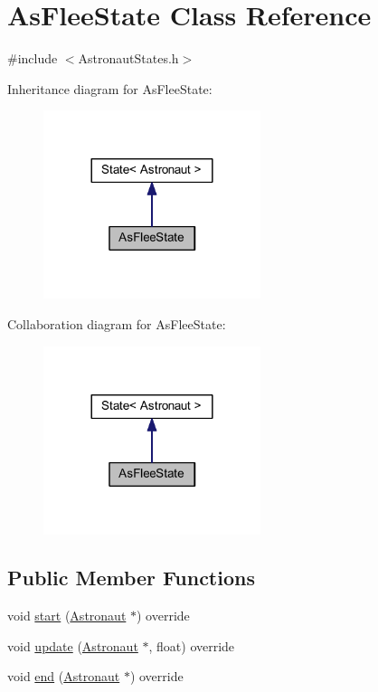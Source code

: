 \hypertarget{class_as_flee_state}{}\section{As\+Flee\+State Class Reference}
\label{class_as_flee_state}


{\ttfamily \#include $<$Astronaut\+States.\+h$>$}



Inheritance diagram for As\+Flee\+State\+:\nopagebreak
\begin{figure}[H]
\begin{center}
\leavevmode
\includegraphics[width=180pt]{class_as_flee_state__inherit__graph}
\end{center}
\end{figure}


Collaboration diagram for As\+Flee\+State\+:\nopagebreak
\begin{figure}[H]
\begin{center}
\leavevmode
\includegraphics[width=180pt]{class_as_flee_state__coll__graph}
\end{center}
\end{figure}
\subsection*{Public Member Functions}
\begin{DoxyCompactItemize}
\item 
void \hyperlink{class_as_flee_state_a73dfdf7af46e5bce0b212030413cd00c}{start} (\hyperlink{class_astronaut}{Astronaut} $\ast$) override
\item 
void \hyperlink{class_as_flee_state_a2a6af75f427daa36c6e480f531e783ee}{update} (\hyperlink{class_astronaut}{Astronaut} $\ast$, float) override
\item 
void \hyperlink{class_as_flee_state_a58912e7f5eed181065942f81d2e4e22a}{end} (\hyperlink{class_astronaut}{Astronaut} $\ast$) override
\end{DoxyCompactItemize}

